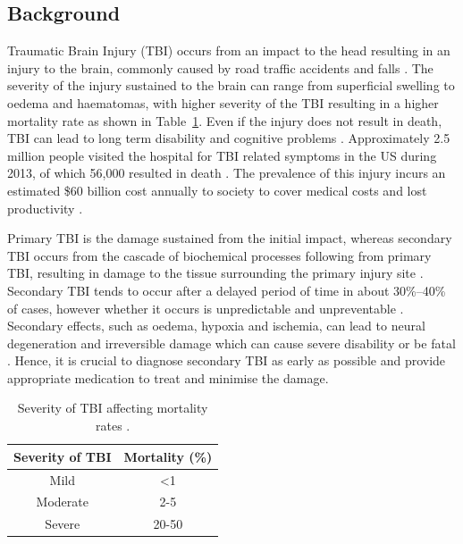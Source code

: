 \subsection{Background}
Traumatic Brain Injury (TBI) occurs from an impact to the head resulting in an injury to the brain, commonly caused by road traffic accidents and falls \cite{Langlois2006}. The severity of the injury sustained to the brain can range from superficial swelling to oedema and haematomas, with higher severity of the TBI resulting in a higher mortality rate as shown in Table~\ref{table:severity of TBI}. Even if the injury does not result in death, TBI can lead to long term disability and cognitive problems \cite{WorldHealthOrganisation2006}. Approximately 2.5 million people visited the hospital for TBI related symptoms in the US during 2013, of which 56,000 resulted in death \cite{Taylor2017}. The prevalence of this injury incurs an estimated \$60 billion cost annually to society to cover medical costs and lost productivity \cite{Finkelstein2009}. 

Primary TBI is the damage sustained from the initial impact, whereas secondary TBI occurs from the cascade of biochemical processes following from primary TBI, resulting in damage to the tissue surrounding the primary injury site \cite{Norton2008}. Secondary TBI tends to occur after a delayed period of time in about 30\%--40\% of cases, however whether it occurs is unpredictable and unpreventable \cite{Pagkalos2017}. Secondary effects, such as oedema, hypoxia and ischemia, can lead to neural degeneration and irreversible damage which can cause severe disability or be fatal \cite{Murthy2005}. Hence, it is crucial to diagnose secondary TBI as early as possible and provide appropriate medication to treat and minimise the damage.

\begin{table}[H]
\centering
\begin{tabular}{||c c||} 
 \hline
 Severity of TBI & Mortality (\%) \\ [0.5ex] 
 \hline\hline
 Mild & \textless 1 \\ 
 Moderate & 2-5 \\
 Severe & 20-50 \\
 \hline
\end{tabular}
\caption{Severity of TBI affecting mortality rates \cite{WorldHealthOrganisation2006}.}
\label{table:severity of TBI}
\end{table}


